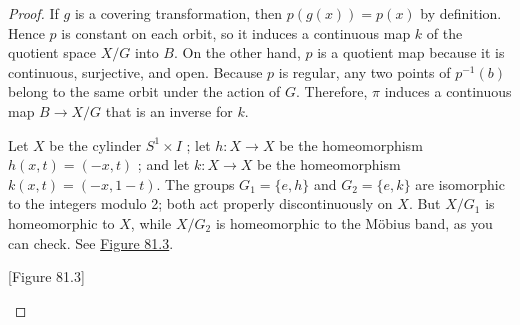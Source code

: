 \par\nopagebreak
\begin{center}
	\label{fig:com_81_6}
\end{center}
\par\nopagebreak 

\begin{proof}
	If \(g\) is a covering transformation, then \(p( {g(x) }) = p(x)\) by definition. Hence \(p\) is constant on each orbit, so it induces a continuous map \(k\) of the quotient space \(X/G\) into \(B\). On the other hand, \(p\) is a quotient map because it is continuous, surjective, and open. Because \(p\) is regular, any two points of \(p^{-1}( b)\) belong to the same orbit under the action of \(G\). Therefore, \(\pi\) induces a continuous map \(B \rightarrow X/G\) that is an inverse for \(k\).
\begin{centeredblock}
\begin{example}
\label{ex:\thesection.\theexample}
	Let \(X\) be the cylinder \(S^{1} \times I\) ; let \(h : X \rightarrow X\) be the homeomorphism \(h( {x,t}) = ( {-x,t})\) ; and let \(k : X \rightarrow X\) be the homeomorphism \(k( {x,t}) = ( {-x,1 - t})\). The groups \(G_{1} = \{ e,h\}\) and \(G_{2} = \{ e,k\}\) are isomorphic to the integers modulo 2; both act properly discontinuously on \(X\). But \(X/G_{1}\) is homeomorphic to \(X\), while \(X/G_{2}\) is homeomorphic to the Möbius band, as you can check. See \hyperref[fig:81.3]{Figure 81.3}.

[Figure 81.3]
\end{example}
\end{centeredblock}
\end{proof}
